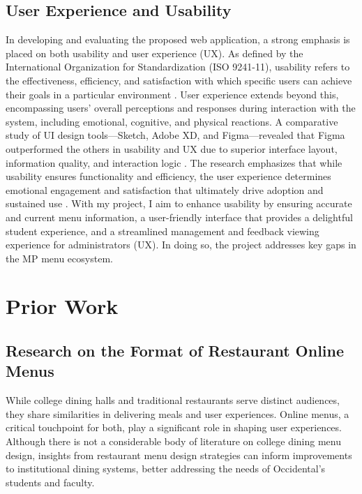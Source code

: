 \documentclass[10pt,twocolumn]{article}
\begin{document}
\subsection{User Experience and Usability}
In developing and evaluating the proposed web application, a strong emphasis is placed on both usability and user experience (UX). As defined by the International Organization for Standardization (ISO 9241-11), usability refers to the effectiveness, efficiency, and satisfaction with which specific users can achieve their goals in a particular environment \cite{ISO2018}. User experience extends beyond this, encompassing users' overall perceptions and responses during interaction with the system, including emotional, cognitive, and physical reactions. A comparative study of UI design tools—Sketch, Adobe XD, and Figma—revealed that Figma outperformed the others in usability and UX due to superior interface layout, information quality, and interaction logic \cite{UX2022}. The research emphasizes that while usability ensures functionality and efficiency, the user experience determines emotional engagement and satisfaction that ultimately drive adoption and sustained use \cite{UX2022}. With my project, I aim to enhance usability by ensuring accurate and current menu information, a user-friendly interface that provides a delightful student experience, and a streamlined management and feedback viewing experience for administrators (UX). In doing so, the project addresses key gaps in the MP menu ecosystem.

\section{Prior Work}
\subsection{ Research on the Format of Restaurant Online Menus}
While college dining halls and traditional restaurants serve distinct audiences, they share similarities in delivering meals and user experiences. Online menus, a critical touchpoint for both, play a significant role in shaping user experiences. Although there is not a considerable body of literature on college dining menu design, insights from restaurant menu design strategies can inform improvements to institutional dining systems, better addressing the needs of Occidental’s students and faculty.
\end{document}
